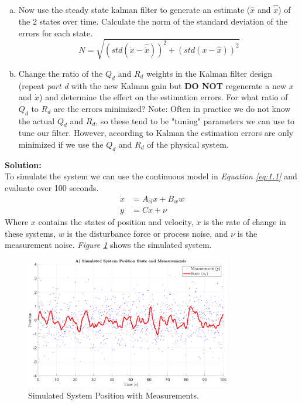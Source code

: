 \documentclass[10pt]{article}
\newcommand{\solution}{\textbf{Solution: \\}}
\begin{document}
\begin{enumerate}[label=\textbf{\arabic*.}]
\begin{enumerate}[(a)]
    \item Now use the steady state kalman filter to generate an estimate 
    ($\hat{x}$ and $\hat{\dot{x}}$) of the 2 states over time. Calculate the 
    norm of the standard deviation of the errors for each state.
    \begin{equation}
      N = \sqrt{( std(\dot{x} - \hat{\dot{x}}) )^2 + ( std(x - \hat{x}) )^2}
      \label{eq:1.7}
    \end{equation}

    \item Change the ratio of the $Q_d$ and $R_d$ weights in the Kalman filter 
    design (repeat \emph{part d} with the new Kalman gain but \textbf{DO NOT} 
    regenerate a new $x$ and $\dot{x}$) and determine the effect on the 
    estimation errors. For what ratio of $Q_d$ to $R_d$ are the errors 
    minimized? Note: Often in practice we do not know the actual $Q_d$ and 
    $R_d$, so these tend to be "tuning" parameters we can use to tune our 
    filter. However, according to Kalman the estimation errors are only 
    minimized if we use the $Q_d$ and $R_d$ of the physical system.
  \end{enumerate}
  \vspace{10pt}

  \solution
  To simulate the system we can use the continuous model in \emph{Equation 
  \ref{eq:1.1}} and evaluate over 100 seconds.
  \begin{equation}
    \begin{split}
      \dot{x} &= A_{cl} x + B_w w \\
      y &= C x + \nu
    \end{split}
    \label{eq:1.1}
  \end{equation}
  Where $x$ contains the states of position and velocity, $\dot{x}$ is the 
  rate of change in these systems, $w$ is the disturbance force or process 
  noise, and $\nu$ is the measurement noise. \emph{Figure \ref{f:1.1}} shows 
  the simulated system.
  \begin{figure}[H]
    \centering
    \includegraphics[width=0.8\textwidth]{p1_a.png}
    \caption{Simulated System Position with Measurements.}
    \label{f:1.1}
  \end{figure}


\end{enumerate}
\end{document}
